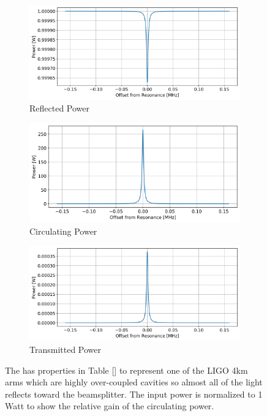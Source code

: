 	
			\begin{figure}[ht]
		\centering
		\begin{subfigure}[b]{0.45\textwidth}
			\centering
			\includegraphics[width=\textwidth]{../Figures/Arm_Refl.png}
			\caption{Reflected Power}
			\label{fig:FP_refl}
		\end{subfigure}
		\hfill
		\begin{subfigure}[b]{0.45\textwidth}
			\centering
			\includegraphics[width=\textwidth]{../Figures/Arm_Circ.png}
			\caption{Circulating Power}
			\label{fig:FP_circ}
		\end{subfigure}
		\hfill
		\begin{subfigure}[b]{0.45\textwidth}
			\centering
			\includegraphics[width=\textwidth]{../Figures/Arm_Tran.png}
			\caption{Transmitted Power}
			\label{fig:FP_tran}
		\end{subfigure}
		\caption[The reflected, circulating, and transmitted powers for a single Fabry-Perot cavity.]
		{The  has properties in Table [] to represent one of the LIGO 4km arms which are highly over-coupled cavities so almost all of the light reflects toward the beamsplitter.  The input power is normalized to 1 Watt to show the relative gain of the circulating power.}
		\label{fig:FP_pwrs}
		\end{figure}
		
